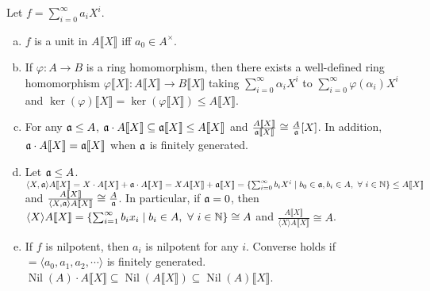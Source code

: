 \begin{proposition}
    Let $f = \sum_{i=0}^\infty a_iX^i$.
    \begin{enumerate}[(a)]
        \item $f$ is a unit in $A \llbracket X \rrbracket$ iff $a_0 \in A^\times$.
        \item If $\varphi: A \to B$ is a ring homomorphism, then there exists a well-defined ring homomorphism $\varphi\llbracket X \rrbracket: A\llbracket X \rrbracket \to B\llbracket X \rrbracket$ taking $\sum_{i=0}^\infty \alpha_iX^i$ to $\sum_{i=0}^\infty \varphi(\alpha_i)X^i$ and $\ker(\varphi)\llbracket X \rrbracket = \ker(\varphi \llbracket X \rrbracket) \leq A\llbracket X \rrbracket$.
        \item For any $\mathfrak{a} \leq A$, $\mathfrak{a} \cdot A \llbracket X \rrbracket \subseteq \mathfrak{a} \llbracket X \rrbracket \leq A\llbracket X \rrbracket$ and $\frac{A \llbracket X \rrbracket}{\mathfrak{a} \llbracket X \rrbracket} \cong \frac{A}{\mathfrak{a}}[X]$. In addition, $\mathfrak{a} \cdot A\llbracket X \rrbracket = \mathfrak{a} \llbracket X \rrbracket$ when $\mathfrak{a}$ is finitely generated. 
        \item Let $\mathfrak{a} \leq A$. $\langle X,\mathfrak{a} \rangle A\llbracket X \rrbracket = X \cdot A \llbracket X \rrbracket + \mathfrak{a} \cdot A \llbracket X \rrbracket = XA \llbracket X \rrbracket + \mathfrak{a} \llbracket X \rrbracket = \{\sum_{i=0}^\infty b_iX^i \mid b_0 \in \mathfrak{a}, b_i \in A,\ \forall \  i \in \mathbb{N}\} \leq A \llbracket X \rrbracket$ and $\frac{A \llbracket X \rrbracket}{\langle X,\mathfrak{a} \rangle A \llbracket X \rrbracket} \cong \frac{A}{\mathfrak{a}}$. In particular, if $\mathfrak{a} = 0$, then $\langle X \rangle A \llbracket X \rrbracket = \{\sum_{i=1}^\infty b_ix_i \mid b_i \in A, \ \forall \  i \in \mathbb{N} \} \cong A$ and $\frac{A\llbracket X \rrbracket}{\langle X \rangle A \llbracket X \rrbracket} \cong A$. 
        \item If $f$ is nilpotent, then $a_i$ is nilpotent for any $i$. Converse holds if $ = \langle a_0,a_1,a_2,\cdots \rangle$ is finitely generated. $\operatorname{Nil}(A) \cdot A \llbracket X \rrbracket \subseteq \operatorname{Nil}(A \llbracket X \rrbracket) \subseteq \operatorname{Nil}(A) \llbracket X \rrbracket$.
    \end{enumerate}
\end{proposition}

